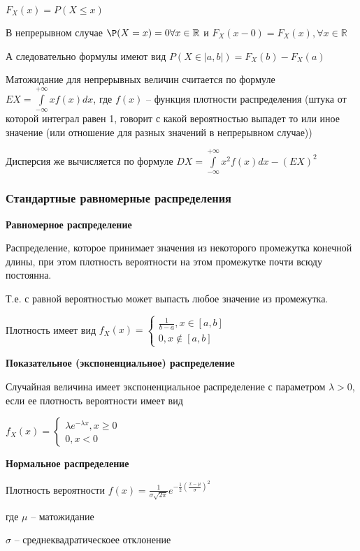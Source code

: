\documentclass{article}
\begin{document}
$F_X(x) = P(X \le x)$


В непрерывном случае $\P(X = x) = 0 \forall x \in \mathbb{R}$
и $F_X(x - 0) = F_X(x), \forall x \in \mathbb{R}$

А следовательно формулы имеют вид $P(X \in |a, b|) = F_X(b) - F_X(a)$



Матожидание для непрерывных величин считается по формуле $EX = \int\limits_{-\infty}^{+\infty}xf(x)dx$, где $f(x)$ -- функция плотности распределения (штука от которой интеграл равен 1, говорит с какой вероятностью выпадет то или иное значение (или отношение для разных значений в непрерывном случае))


Дисперсия же вычисляется по формуле $DX = \int\limits_{-\infty}^{+\infty} x^2 f(x) dx - (EX)^2$

\subsubsection{Стандартные равномерные распределения}

{\bf Равномерное распределение}

Распределение, которое принимает значения из некоторого промежутка конечной длины, при этом плотность вероятности на этом промежутке почти всюду постоянна.

Т.е. с равной вероятностью может выпасть любое значение из промежутка.

Плотность имеет вид $f_X(x) = \begin{cases}
	\frac{1}{b - a}, x \in [a, b]\\
	0, x \not\in [a, b]
\end{cases}$

{\bf Показательное (экспоненциальное) распределение}

Случайная величина имеет экспоненциальное распределение с параметром $\lambda > 0$, если ее плотность вероятности имеет вид

$f_X(x) = \begin{cases}
	\lambda e^{-\lambda x}, x \ge 0\\
	0, x < 0
\end{cases}$

{\bf Нормальное распределение}


Плотность вероятности $f(x) = \frac{1}{\sigma \sqrt{2 \pi}}e^{-\frac{1}{2}(\frac{x - \mu}{\sigma})^2}$

где $\mu$ -- матожидание

$\sigma$ -- среднеквадратическоее отклонение
\end{document}
